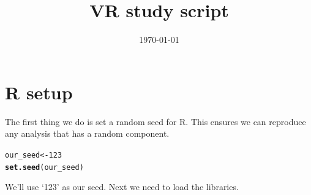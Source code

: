 \documentclass{scrartcl}\usepackage[]{graphicx}\usepackage[]{color}
\title{VR study script}
\subtitle{}
\date{\today}
\makeatletter
\newcommand{\hlnum}[1]{\textcolor[rgb]{0.686,0.059,0.569}{#1}}%
\newcommand{\hlstd}[1]{\textcolor[rgb]{0.345,0.345,0.345}{#1}}%
\newcommand{\hlkwb}[1]{\textcolor[rgb]{0.69,0.353,0.396}{#1}}%
\newcommand{\hlkwd}[1]{\textcolor[rgb]{0.737,0.353,0.396}{\textbf{#1}}}%
\newenvironment{kframe}{%
 \def\at@end@of@kframe{}%
 \ifinner\ifhmode%
  \def\at@end@of@kframe{\end{minipage}}%
  \begin{minipage}{\columnwidth}%
 \fi\fi%
 \def\FrameCommand##1{\hskip\@totalleftmargin \hskip-\fboxsep
 \colorbox{shadecolor}{##1}\hskip-\fboxsep
     \hskip-\linewidth \hskip-\@totalleftmargin \hskip\columnwidth}%
 \MakeFramed {\advance\hsize-\width
   \@totalleftmargin\z@ \linewidth\hsize
   \@setminipage}}%
 {\par\unskip\endMakeFramed%
 \at@end@of@kframe}
\newenvironment{knitrout}{}{} %
\makeatother
\begin{document}
\maketitle
\newpage
{}

\section{R setup}
\label{sec:r-setup}

The first thing we do is set a random seed for R. This ensures we can
reproduce any analysis that has a random component.

\begin{knitrout}
\color{fgcolor}\begin{kframe}
\begin{alltt}
\hlstd{our_seed} \hlkwb{<-} \hlnum{123}
\hlkwd{set.seed}\hlstd{(our_seed)}
\end{alltt}
\end{kframe}
\end{knitrout}

We'll use `123' as our seed. Next we need to load the
libraries.
\end{document}
